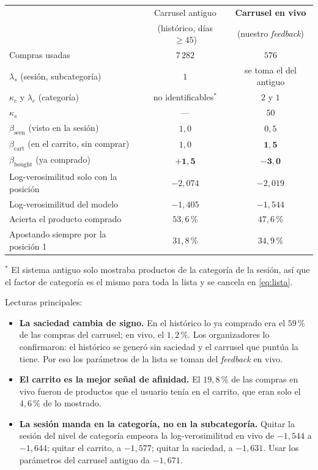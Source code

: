 \documentclass[11pt,a4paper]{article}
\begin{document}
\begin{center}
\small
\begin{tabular}{p{6.3cm}cc}
\toprule
 & Carrusel antiguo & \textbf{Carrusel en vivo}\\
 & (histórico, días $\ge 45$) & (nuestro \emph{feedback})\\
\midrule
Compras usadas & $7\,282$ & $576$\\
$\lambda_s$ (sesión, subcategoría) & $1$ & se toma el del antiguo\\
$\kappa_c$ y $\lambda_c$ (categoría) & no identificables$^{*}$ & $2$ y $1$\\
$\kappa_s$ & --- & $50$\\
$\beta_{\text{seen}}$ (visto en la sesión) & $1{,}0$ & $0{,}5$\\
$\beta_{\text{cart}}$ (en el carrito, sin comprar) & $1{,}0$ & $\mathbf{1{,}5}$\\
$\beta_{\text{bought}}$ (ya comprado) & $\mathbf{+1{,}5}$ & $\mathbf{-3{,}0}$\\
\midrule
Log-verosimilitud solo con la posición & $-2{,}074$ & $-2{,}019$\\
Log-verosimilitud del modelo & $-1{,}405$ & $-1{,}544$\\
Acierta el producto comprado & $53{,}6$\,\% & $47{,}6$\,\%\\
Apostando siempre por la posición 1 & $31{,}8$\,\% & $34{,}9$\,\%\\
\bottomrule
\end{tabular}
\end{center}
{\small $^{*}$ El sistema antiguo solo mostraba productos de la categoría de la sesión, así que el
factor de categoría es el mismo para toda la lista y se cancela en \eqref{eq:lista}.}

Lecturas principales:
\begin{itemize}\setlength{\itemsep}{0.15em}
\item \textbf{La saciedad cambia de signo.} En el histórico lo ya comprado era el $59$\,\% de las compras
del carrusel; en vivo, el $1{,}2$\,\%. Los organizadores lo confirmaron: el histórico se generó sin
saciedad y el carrusel que puntúa la tiene. Por eso los parámetros de la lista se toman del
\emph{feedback} en vivo.
\item \textbf{El carrito es la mejor señal de afinidad.} El $19{,}8$\,\% de las compras en vivo fueron de
productos que el usuario tenía en el carrito, que eran solo el $4{,}6$\,\% de lo mostrado.
\item \textbf{La sesión manda en la categoría, no en la subcategoría.} Quitar la sesión del nivel de
categoría empeora la log-verosimilitud en vivo de $-1{,}544$ a $-1{,}644$; quitar el carrito, a $-1{,}577$; quitar
la saciedad, a $-1{,}631$. Usar los parámetros del carrusel antiguo da $-1{,}671$.
\end{itemize}
\end{document}
